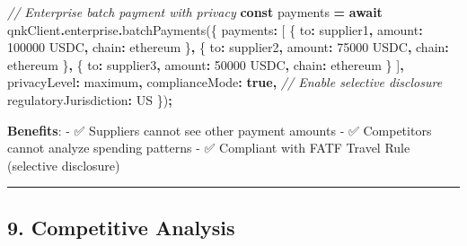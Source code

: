 \documentclass[
  11pt,
]{article}
\newenvironment{Shaded}{\begin{snugshade}}{\end{snugshade}}
\newcommand{\AttributeTok}[1]{\textcolor[rgb]{0.77,0.63,0.00}{#1}}
\newcommand{\CommentTok}[1]{\textcolor[rgb]{0.56,0.35,0.01}{\textit{#1}}}
\newcommand{\ControlFlowTok}[1]{\textcolor[rgb]{0.13,0.29,0.53}{\textbf{#1}}}
\newcommand{\DataTypeTok}[1]{\textcolor[rgb]{0.13,0.29,0.53}{#1}}
\newcommand{\FunctionTok}[1]{\textcolor[rgb]{0.00,0.00,0.00}{#1}}
\newcommand{\KeywordTok}[1]{\textcolor[rgb]{0.13,0.29,0.53}{\textbf{#1}}}
\newcommand{\NormalTok}[1]{#1}
\newcommand{\OperatorTok}[1]{\textcolor[rgb]{0.81,0.36,0.00}{\textbf{#1}}}
\newcommand{\StringTok}[1]{\textcolor[rgb]{0.31,0.60,0.02}{#1}}
\begin{document}
\begin{Shaded}
\begin{Highlighting}[]
\CommentTok{// Enterprise batch payment with privacy}
\KeywordTok{const}\NormalTok{ payments }\OperatorTok{=} \ControlFlowTok{await}\NormalTok{ qnkClient}\OperatorTok{.}\AttributeTok{enterprise}\OperatorTok{.}\FunctionTok{batchPayments}\NormalTok{(\{}
  \DataTypeTok{payments}\OperatorTok{:}\NormalTok{ [}
\NormalTok{    \{ }\DataTypeTok{to}\OperatorTok{:} \StringTok{\textquotesingle{}supplier1\textquotesingle{}}\OperatorTok{,} \DataTypeTok{amount}\OperatorTok{:} \StringTok{\textquotesingle{}100000 USDC\textquotesingle{}}\OperatorTok{,} \DataTypeTok{chain}\OperatorTok{:} \StringTok{\textquotesingle{}ethereum\textquotesingle{}}\NormalTok{ \}}\OperatorTok{,}
\NormalTok{    \{ }\DataTypeTok{to}\OperatorTok{:} \StringTok{\textquotesingle{}supplier2\textquotesingle{}}\OperatorTok{,} \DataTypeTok{amount}\OperatorTok{:} \StringTok{\textquotesingle{}75000 USDC\textquotesingle{}}\OperatorTok{,} \DataTypeTok{chain}\OperatorTok{:} \StringTok{\textquotesingle{}ethereum\textquotesingle{}}\NormalTok{ \}}\OperatorTok{,}
\NormalTok{    \{ }\DataTypeTok{to}\OperatorTok{:} \StringTok{\textquotesingle{}supplier3\textquotesingle{}}\OperatorTok{,} \DataTypeTok{amount}\OperatorTok{:} \StringTok{\textquotesingle{}50000 USDC\textquotesingle{}}\OperatorTok{,} \DataTypeTok{chain}\OperatorTok{:} \StringTok{\textquotesingle{}ethereum\textquotesingle{}}\NormalTok{ \}}
\NormalTok{  ]}\OperatorTok{,}
  \DataTypeTok{privacyLevel}\OperatorTok{:} \StringTok{\textquotesingle{}maximum\textquotesingle{}}\OperatorTok{,}
  \DataTypeTok{complianceMode}\OperatorTok{:} \KeywordTok{true}\OperatorTok{,}  \CommentTok{// Enable selective disclosure}
  \DataTypeTok{regulatoryJurisdiction}\OperatorTok{:} \StringTok{\textquotesingle{}US\textquotesingle{}}
\NormalTok{\})}\OperatorTok{;}
\end{Highlighting}
\end{Shaded}

\textbf{Benefits}: - ✅ Suppliers cannot see other payment amounts - ✅
Competitors cannot analyze spending patterns - ✅ Compliant with FATF
Travel Rule (selective disclosure)

\begin{center}\rule{0.5\linewidth}{0.5pt}\end{center}

\hypertarget{competitive-analysis}{%
\subsection{9. Competitive Analysis}\label{competitive-analysis}}
\end{document}
